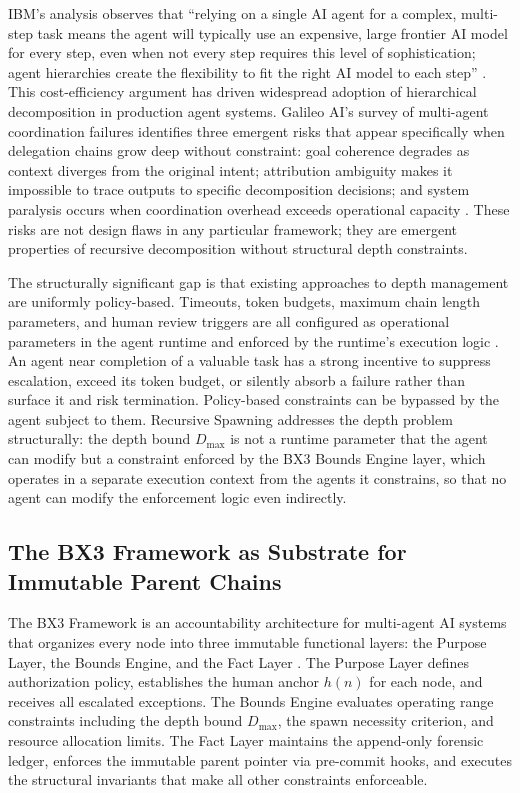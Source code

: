 IBM's analysis observes that ``relying on a single AI agent for a complex, multi-step task means the agent will typically use an expensive, large frontier AI model for every step, even when not every step requires this level of sophistication; agent hierarchies create the flexibility to fit the right AI model to each step'' \cite{ibm2025hierarchical}. This cost-efficiency argument has driven widespread adoption of hierarchical decomposition in production agent systems. Galileo AI's survey of multi-agent coordination failures identifies three emergent risks that appear specifically when delegation chains grow deep without constraint: goal coherence degrades as context diverges from the original intent; attribution ambiguity makes it impossible to trace outputs to specific decomposition decisions; and system paralysis occurs when coordination overhead exceeds operational capacity \cite{multi_agent_coordination_strategies}. These risks are not design flaws in any particular framework; they are emergent properties of recursive decomposition without structural depth constraints.

The structurally significant gap is that existing approaches to depth management are uniformly policy-based. Timeouts, token budgets, maximum chain length parameters, and human review triggers are all configured as operational parameters in the agent runtime and enforced by the runtime's execution logic \cite{multi_agent_coordination_strategies,nist2023}. An agent near completion of a valuable task has a strong incentive to suppress escalation, exceed its token budget, or silently absorb a failure rather than surface it and risk termination. Policy-based constraints can be bypassed by the agent subject to them. Recursive Spawning addresses the depth problem structurally: the depth bound $D_{\max}$ is not a runtime parameter that the agent can modify but a constraint enforced by the BX3 Bounds Engine layer, which operates in a separate execution context from the agents it constrains, so that no agent can modify the enforcement logic even indirectly.

\subsection{The BX3 Framework as Substrate for Immutable Parent Chains}\label{sec:bx3-substrate}

The BX3 Framework is an accountability architecture for multi-agent AI systems that organizes every node into three immutable functional layers: the Purpose Layer, the Bounds Engine, and the Fact Layer \cite{bx3framework,bx3framework2026}. The Purpose Layer defines authorization policy, establishes the human anchor $h(n)$ for each node, and receives all escalated exceptions. The Bounds Engine evaluates operating range constraints including the depth bound $D_{\max}$, the spawn necessity criterion, and resource allocation limits. The Fact Layer maintains the append-only forensic ledger, enforces the immutable parent pointer via pre-commit hooks, and executes the structural invariants that make all other constraints enforceable.

